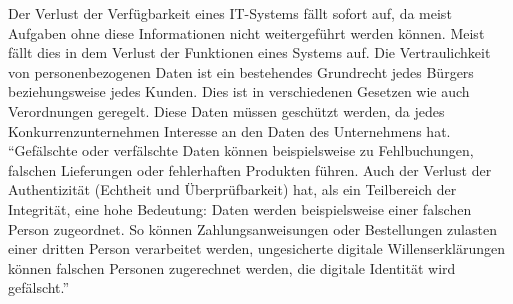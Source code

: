 Der Verlust der Verfügbarkeit eines IT-Systems fällt sofort auf, da meist Aufgaben ohne diese Informationen nicht weitergeführt werden können. Meist fällt dies in dem Verlust der Funktionen eines Systems auf. Die Vertraulichkeit von personenbezogenen Daten ist ein bestehendes Grundrecht jedes Bürgers beziehungsweise jedes Kunden. Dies ist in verschiedenen Gesetzen wie auch Verordnungen geregelt. Diese Daten müssen geschützt werden, da jedes Konkurrenzunternehmen Interesse an den Daten des Unternehmens hat. \enquote{Gefälschte oder verfälschte Daten können beispielsweise zu Fehlbuchungen, falschen Lieferungen oder fehlerhaften Produkten führen. Auch der Verlust der Authentizität (Echtheit und Überprüfbarkeit) hat, als ein Teilbereich der Integrität, eine hohe Bedeutung: Daten werden beispielsweise einer falschen Person zugeordnet. So können Zahlungsanweisungen oder Bestellungen zulasten einer dritten Person verarbeitet werden, ungesicherte digitale Willenserklärungen können falschen Personen zugerechnet werden, die digitale Identität wird	gefälscht.}\autocite[][S.\,1]{bundesamt_fur_sicherheit_in_der_informationstechnik_bsi_it-grundschutz-kompendium_2020}

